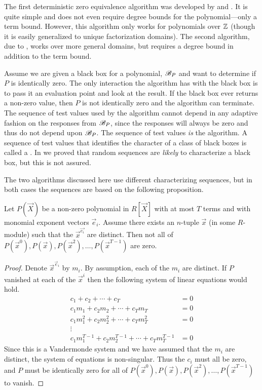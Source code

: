 The first deterministic zero equivalence algorithm was
developed by {\Grigoriev} and {\Karpinski} \cite{Grigoriev87}.  It is
quite simple and does not even require degree bounds for the
polynomial---only a term bound.  However, this algorithm only works for 
polynomials over $\mathbb{Z}$ (though it is easily generalized to unique 
factorization domains).  The second algorithm, due to {\Zippel} 
\cite{Zippel90}, works over more general domains, but requires a degree 
bound in addition to the term bound. 

Assume we are given a black box for a polynomial, ${\cal B}_P$ and
want to determine if $P$ is identically zero.  The
only interaction the algorithm has with the black box is to pass it an
evaluation point and look at the result.  If the black box ever
returns a non-zero value, then $P$ is not identically zero and the
algorithm can terminate.  The sequence of test values used by the
algorithm cannot depend in any adaptive fashion on the responses from
${\cal B}_P$, since the responses will always be zero and thus do not depend
upon ${\cal B}_P$.  The sequence of test values {\em is} the
algorithm.  A sequence of test values that identifies the character of
a class of black boxes is called a .  In
 we proved that random sequences are
{\em likely} to characterize a black box, but this is not assured.

The two algorithms discussed here use different characterizing
sequences, but in both cases the sequences are based on the following 
proposition.

\begin{proposition}\label{Zero:Mon:Prop}
Let $P(\vec{X})$ be a non-zero polynomial in $R[\vec{X}]$ with at most
$T$ terms and with monomial exponent vectors $\vec{e}_i$.  Assume there
exists an $n$-tuple $\vec{x}$ (in some $R$-module) such that the
$\vec{x}^{\vec{e_i}}$ are distinct.  Then not all of $P(\vec{x}^0),
P(\vec{x}), P(\vec{x}^2), \ldots, P(\vec{x}^{T-1})$ are zero.
\end{proposition}

\begin{proof}
Denote $\vec{x}^{\vec{e}_i}$ by $m_i$.  By assumption, each of the
$m_i$ are distinct.  If $P$ vanished at each of the $\vec{x}^i$ then
the following system of linear equations would hold.
\[
\begin{aligned}
  c_1 + c_2 + \cdots + c_T &= 0 \\
  c_1 m_1 + c_2 m_2 + \cdots + c_T m_T &= 0\\
  c_1 m_1^2 + c_2 m_2^2 + \cdots + c_T m_T^2 &= 0\\ \vdots\\
  c_1 m_1^{T-1} + c_2 m_2^{T-1} + \cdots + c_{T} m_T^{T-1}&=0
\end{aligned}
\]
Since this is a Vandermonde system and we have assumed that the $m_i$
are distinct, the system of equations is non-singular.  Thus the $c_i$
must all be zero, and $P$ must be identically zero for all of
$P(\vec{x}^0), P(\vec{x}), P(\vec{x}^2), \ldots, P(\vec{x}^{T-1})$ to 
vanish.
\end{proof}


